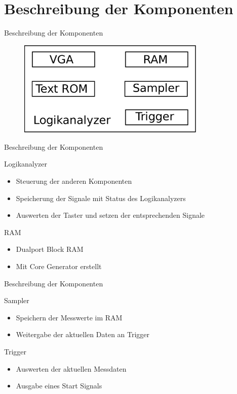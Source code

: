 \section{Beschreibung der Komponenten}
\begin{frame}[<+->]{Beschreibung der Komponenten}
    \begin{figure}
        \centerline{
            \includegraphics[width=0.8\textwidth]{abbildungen/komponenten}
        }
    \end{figure}
\end{frame}
\begin{frame}[<+->]{Beschreibung der Komponenten}
    \begin{block}{Logikanalyzer}
        \begin{itemize}
            \item Steuerung der anderen Komponenten
            \item Speicherung der Signale mit Status des Logikanalyzers
            \item Auswerten der Taster und setzen der entsprechenden Signale
        \end{itemize}
    \end{block}
    \begin{block}{RAM}
        \begin{itemize}
            \item Dualport Block RAM
            \item Mit Core Generator erstellt
        \end{itemize}
    \end{block}
\end{frame}
\begin{frame}[<+->]{Beschreibung der Komponenten}
    \begin{block}{Sampler}
        \begin{itemize}
            \item Speichern der Messwerte im RAM
            \item Weitergabe der aktuellen Daten an Trigger
        \end{itemize}
    \end{block}
    \begin{block}{Trigger}
        \begin{itemize}
            \item Auswerten der aktuellen Messdaten
            \item Ausgabe eines Start Signals
        \end{itemize}
    \end{block}
\end{frame}
